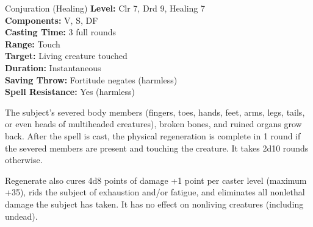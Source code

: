 {Conjuration (Healing)}
{
	\textbf{Level:}
	Clr 7, Drd 9, Healing 7\\
	\textbf{Components:}
	V, S, DF\\
	\textbf{Casting Time:}
	3 full rounds\\
	\textbf{Range:}
	Touch\\
	\textbf{Target:}
	Living creature touched\\
	\textbf{Duration:}
	Instantaneous\\
	\textbf{Saving Throw:}
	Fortitude negates (harmless)\\
	\textbf{Spell Resistance:}
	Yes (harmless)\\
}
{
	The subject's severed body members (fingers, toes, hands, feet, arms, legs, tails, or even heads of multiheaded creatures), broken bones, and ruined organs grow back. After the spell is cast, the physical regeneration is complete in 1 round if the severed members are present and touching the creature. It takes 2d10 rounds otherwise.

	Regenerate also cures 4d8 points of damage +1 point per caster level (maximum +35), rids the subject of exhaustion and/or fatigue, and eliminates all nonlethal damage the subject has taken. It has no effect on nonliving creatures (including undead).

}
